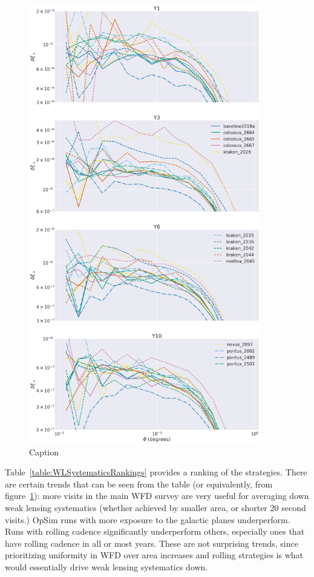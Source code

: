 \begin{figure}[hb]
    \centering
    \caption{Caption}
    \label{fig:WLSystematicsRanking}
\includegraphics[width=0.9\textwidth]{figures/WLSystematicsAllYears.png}
\end{figure}


Table~\ref{table:WLSystematicsRankings} provides a ranking of the strategies. There are certain trends that can be seen from the table (or equivalently, from figure~\ref{fig:WLSystematicsRanking}): more visits in the main WFD survey are very useful for averaging down weak lensing systematics (whether achieved by smaller area, or shorter 20 second visits.) OpSim runs with more exposure to the galactic planes underperform. Runs with rolling cadence significantly underperform others, especially ones that have rolling cadence in all or most years. These are not surprising trends, since prioritizing uniformity in WFD over area increases and rolling strategies is what would essentially drive weak lensing systematics down.

